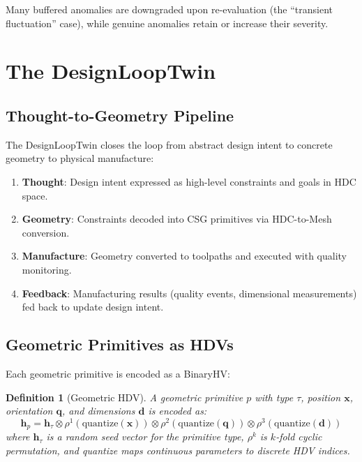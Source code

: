 \documentclass[11pt,a4paper]{article}
\newtheorem{definition}{Definition}
\begin{document}
Many buffered anomalies are downgraded upon re-evaluation (the ``transient fluctuation'' case), while genuine anomalies retain or increase their severity.

\section{The DesignLoopTwin}

\subsection{Thought-to-Geometry Pipeline}

The DesignLoopTwin closes the loop from abstract design intent to concrete geometry to physical manufacture:

\begin{enumerate}[nosep]
    \item \textbf{Thought}: Design intent expressed as high-level constraints and goals in HDC space.
    \item \textbf{Geometry}: Constraints decoded into CSG primitives via HDC-to-Mesh conversion.
    \item \textbf{Manufacture}: Geometry converted to toolpaths and executed with quality monitoring.
    \item \textbf{Feedback}: Manufacturing results (quality events, dimensional measurements) fed back to update design intent.
\end{enumerate}

\subsection{Geometric Primitives as HDVs}

Each geometric primitive is encoded as a BinaryHV:

\begin{definition}[Geometric HDV]
A geometric primitive $p$ with type $\tau$, position $\mathbf{x}$, orientation $\mathbf{q}$, and dimensions $\mathbf{d}$ is encoded as:
\begin{equation}
\mathbf{h}_p = \mathbf{h}_\tau \otimes \rho^1(\text{quantize}(\mathbf{x})) \otimes \rho^2(\text{quantize}(\mathbf{q})) \otimes \rho^3(\text{quantize}(\mathbf{d}))
\end{equation}
where $\mathbf{h}_\tau$ is a random seed vector for the primitive type, $\rho^k$ is $k$-fold cyclic permutation, and quantize maps continuous parameters to discrete HDV indices.
\end{definition}
\end{document}
